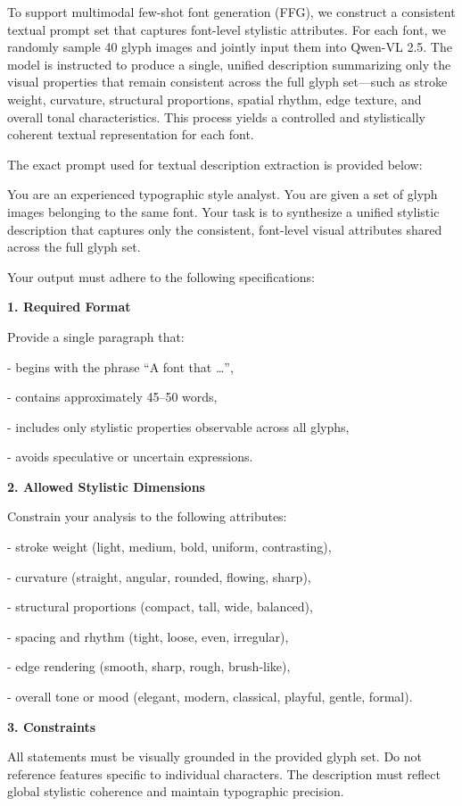 To support multimodal few-shot font generation (FFG), we construct a consistent textual prompt set that captures font-level stylistic attributes. For each font, we randomly sample 40 glyph images and jointly input them into Qwen-VL 2.5. The model is instructed to produce a single, unified description summarizing only the visual properties that remain consistent across the full glyph set—such as stroke weight, curvature, structural proportions, spatial rhythm, edge texture, and overall tonal characteristics. This process yields a controlled and stylistically coherent textual representation for each font.

The exact prompt used for textual description extraction is provided below:

\begin{FontExtractPrompt}
You are an experienced typographic style analyst. You are given a set of glyph images belonging to the same font. Your task is to synthesize a unified stylistic description that captures only the consistent, font-level visual attributes shared across the full glyph set.

Your output must adhere to the following specifications:

\textbf{1. Required Format}  

Provide a single paragraph that:

- begins with the phrase “A font that …”,

- contains approximately 45–50 words,

- includes only stylistic properties observable across all glyphs,

- avoids speculative or uncertain expressions.

\textbf{2. Allowed Stylistic Dimensions}  

Constrain your analysis to the following attributes:

- stroke weight (light, medium, bold, uniform, contrasting),

- curvature (straight, angular, rounded, flowing, sharp),

- structural proportions (compact, tall, wide, balanced),

- spacing and rhythm (tight, loose, even, irregular),

- edge rendering (smooth, sharp, rough, brush-like),

- overall tone or mood (elegant, modern, classical, playful, gentle, formal).

\textbf{3. Constraints}  

All statements must be visually grounded in the provided glyph set. Do not reference features specific to individual characters. The description must reflect global stylistic coherence and maintain typographic precision.

\end{FontExtractPrompt}


